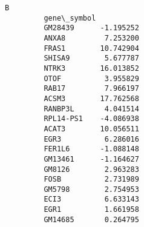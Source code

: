 \documentclass[11pt]{article}
\begin{document}
\begin{Verbatim}[commandchars=\\\{\}]
                              B  
         gene\_symbol             
         GM28439      -1.195252  
         ANXA8         7.253200  
         FRAS1        10.742904  
         SHISA9        5.677787  
         NTRK3        16.013852  
         OTOF          3.955829  
         RAB17         7.966197  
         ACSM3        17.762568  
         RANBP3L       4.041514  
         RPL14-PS1    -4.086938  
         ACAT3        10.056511  
         EGR3          6.286016  
         FER1L6       -1.088148  
         GM13461      -1.164627  
         GM8126        2.963283  
         FOSB          2.731989  
         GM5798        2.754953  
         ECI3          6.633143  
         EGR1          1.661958  
         GM14685       0.264795  
\end{Verbatim}
            

    
    
    
    
\end{document}
